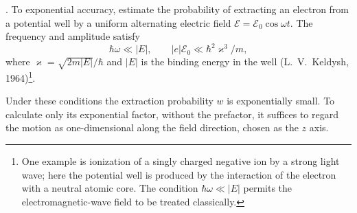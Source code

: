 . To exponential accuracy, estimate the probability of extracting an electron from a potential well by a uniform alternating electric field $\mathcal E=\mathcal E_0\cos\omega t$. The frequency and amplitude satisfy
\[
 \hbar\omega\ll|E|,\qquad |e|\mathcal E_0\ll\hbar^2\varkappa^3/m,
\]
where $\varkappa=\sqrt{2m|E|}/\hbar$ and $|E|$ is the binding energy in the well (L.~V.~Keldysh, 1964)\footnote{One example is ionization of a singly charged negative ion by a strong light wave; here the potential well is produced by the interaction of the electron with a neutral atomic core. The condition $\hbar\omega\ll|E|$ permits the electromagnetic-wave field to be treated classically.}.

\SolutionHeading Under these conditions the extraction probability $w$ is exponentially small. To calculate only its exponential factor, without the prefactor, it suffices to regard the motion as one-dimensional along the field direction, chosen as the $z$ axis.

